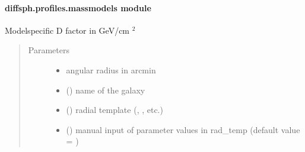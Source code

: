 \documentclass[letterpaper,10pt,english]{sphinxmanual}
\begin{document}
\paragraph{diffsph.profiles.massmodels module}
\label{\detokenize{diffsph.profiles:module-diffsph.profiles.massmodels}}\label{\detokenize{diffsph.profiles:diffsph-profiles-massmodels-module}}

\begin{fulllineitems}
\label{\detokenize{diffsph.profiles:diffsph.profiles.massmodels.D}}
\sphinxAtStartPar
Model\sphinxhyphen{}specific D factor in GeV/cm \({}^2\)
\begin{quote}\begin{description}
\item[{Parameters}] \leavevmode\begin{itemize}
\item {} 
\sphinxAtStartPar
{} \textendash{} angular radius in arcmin

\item {} 
\sphinxAtStartPar
{} () \textendash{} name of the galaxy

\item {} 
\sphinxAtStartPar
{} () \textendash{} radial template (, , etc.)

\item {} 
\sphinxAtStartPar
{} () \textendash{} manual input of parameter values in rad\_temp (default value = )


\end{itemize}
\end{description}
\end{quote}
\end{fulllineitems}
\end{document}
